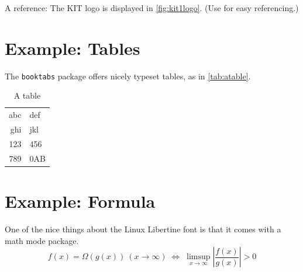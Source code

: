 A reference: The KIT logo is displayed in \autoref{fig:kit1logo}. 
(Use  for easy referencing.) 

\section{Example: Tables}
The \texttt{booktabs} package offers nicely typeset tables, as in \autoref{tab:atable}.

\label{sec:Introduction:Tables}
\begin{table}
\centering
\begin{tabular}{r l}
\toprule
abc & def\\
ghi & jkl\\
\midrule
123 & 456\\
789 & 0AB\\
\bottomrule
\end{tabular}
\caption{A table}
\label{tab:atable}
\end{table}

\section{Example: Formula}
One of the nice things about the Linux Libertine font is that it comes with
a math mode package.
\begin{displaymath}
f(x)=\Omega(g(x))\ (x\rightarrow\infty)\;\Leftrightarrow\;
\limsup_{x \to \infty} \left|\frac{f(x)}{g(x)}\right|> 0
\end{displaymath}

